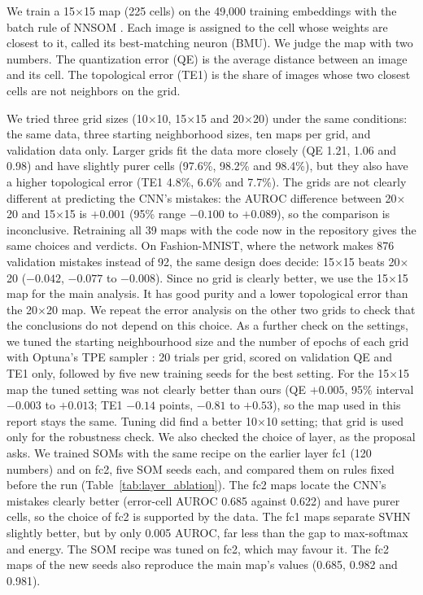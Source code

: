 \documentclass[11pt]{article}
\begin{document}
We train a 15$\times$15 map (225 cells) on the 49,000 training embeddings with the batch rule of NNSOM \parencite{jafari_nnsom,hagan2014nnd_ch26}. Each image is assigned to the cell whose weights are closest to it, called its best-matching neuron (BMU).
We judge the map with two numbers. The quantization error (QE) is the average distance between an image and its cell. The topological error (TE1) is the share of images whose two closest cells are not neighbors on the grid.

We tried three grid sizes (10$\times$10, 15$\times$15 and 20$\times$20) under the same conditions: the same data, three starting neighborhood sizes, ten maps per grid, and validation data only.
Larger grids fit the data more closely (QE 1.21, 1.06 and 0.98) and have slightly purer cells (97.6\%, 98.2\% and 98.4\%), but they also have a higher topological error (TE1 4.8\%, 6.6\% and 7.7\%).
The grids are not clearly different at predicting the CNN's mistakes: the AUROC difference between 20$\times$20 and 15$\times$15 is $+0.001$ (95\% range $-0.100$ to $+0.089$), so the comparison is inconclusive. Retraining all 39 maps with the code now in the repository gives the same choices and verdicts. On Fashion-MNIST, where the network makes 876 validation mistakes instead of 92, the same design does decide: 15$\times$15 beats 20$\times$20 ($-0.042$, $-0.077$ to $-0.008$).
Since no grid is clearly better, we use the 15$\times$15 map for the main analysis. It has good purity and a lower topological error than the 20$\times$20 map.
We repeat the error analysis on the other two grids to check that the conclusions do not depend on this choice.
As a further check on the settings, we tuned the starting neighbourhood size and the number of epochs of each grid with Optuna's TPE sampler \parencite{akiba2019optuna}: 20 trials per grid, scored on validation QE and TE1 only, followed by five new training seeds for the best setting. For the 15$\times$15 map the tuned setting was not clearly better than ours (QE $+0.005$, 95\% interval $-0.003$ to $+0.013$; TE1 $-0.14$ points, $-0.81$ to $+0.53$), so the map used in this report stays the same. Tuning did find a better 10$\times$10 setting; that grid is used only for the robustness check.
We also checked the choice of layer, as the proposal asks. We trained SOMs with the same recipe on the earlier layer fc1 (120 numbers) and on fc2, five SOM seeds each, and compared them on rules fixed before the run (Table~\ref{tab:layer_ablation}). The fc2 maps locate the CNN's mistakes clearly better (error-cell AUROC 0.685 against 0.622) and have purer cells, so the choice of fc2 is supported by the data. The fc1 maps separate SVHN slightly better, but by only 0.005 AUROC, far less than the gap to max-softmax and energy. The SOM recipe was tuned on fc2, which may favour it. The fc2 maps of the new seeds also reproduce the main map's values (0.685, 0.982 and 0.981).
\end{document}
